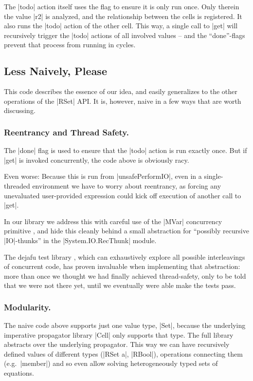 \documentclass[manuscript,screen,acmsmall,nonacm]{acmart}
\begin{document}
The |todo| action itself uses the flag to ensure it is only run once. Only therein the value |r2| is analyzed, and the relationship between the cells is registered. It also runs the |todo| action of the other cell. This way, a single call to |get| will recursively trigger the |todo| actions of all involved values -- and the “done”-flags prevent that process from running in cycles.

\subsection{Less Naively, Please}

This code describes the essence of our idea, and easily generalizes to the other operations of the |RSet| API. It is, however, naive in a few ways that are worth discussing.

\subsubsection{Reentrancy and Thread Safety.}\label{sec:thread}

The |done| flag is used to ensure that the |todo| action is run exactly once. But if |get| is invoked concurrently, the code above is obviously racy.

Even worse: Because this is run from |unsafePerformIO|, even in a single-threaded environment we have to worry about reentrancy, as forcing any unevaluated user-provided expression could kick off execution of another call to |get|.

In our library we address this with careful use of the |MVar| concurrency primitive \cite{concurrent}, and hide this cleanly behind a small abstraction for “possibly recursive |IO|-thunks” in the |System.IO.RecThunk| module.

The dejafu test library \citep{dejafu}, which can exhaustively explore all possible interleavings of concurrent code, has proven invaluable when implementing that abstraction: more than once we thought we had finally achieved thread-safety, only to be told that we were not there yet, until we eventually were able make the tests pass.

\subsubsection{Modularity.}

The naive code above supports just one value type, |Set|, because the underlying imperative propagator library |Cell| only supports that type. The full library abstracts over the underlying propagator. This way we can have recursively defined values of different types (|RSet a|, |RBool|), operations connecting them (e.g.\ |member|) and so even allow solving heterogeneously typed sets of equations.
\end{document}
